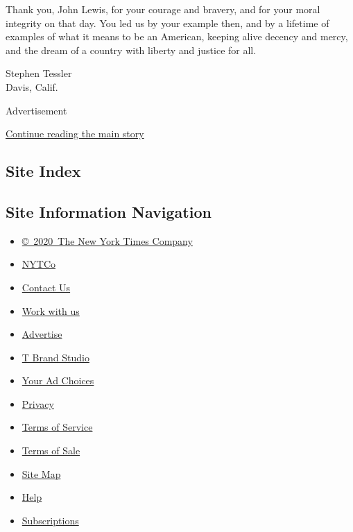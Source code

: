 Thank you, John Lewis, for your courage and bravery, and for your moral
integrity on that day. You led us by your example then, and by a
lifetime of examples of what it means to be an American, keeping alive
decency and mercy, and the dream of a country with liberty and justice
for all.

Stephen Tessler\\
Davis, Calif.

Advertisement

\protect\hyperlink{after-bottom}{Continue reading the main story}

\hypertarget{site-index}{%
\subsection{Site Index}\label{site-index}}

\hypertarget{site-information-navigation}{%
\subsection{Site Information
Navigation}\label{site-information-navigation}}

\begin{itemize}
\tightlist
\item
  \href{https://help.nytimes3xbfgragh.onion/hc/en-us/articles/115014792127-Copyright-notice}{©~2020~The
  New York Times Company}
\end{itemize}

\begin{itemize}
\tightlist
\item
  \href{https://www.nytco.com/}{NYTCo}
\item
  \href{https://help.nytimes3xbfgragh.onion/hc/en-us/articles/115015385887-Contact-Us}{Contact
  Us}
\item
  \href{https://www.nytco.com/careers/}{Work with us}
\item
  \href{https://nytmediakit.com/}{Advertise}
\item
  \href{http://www.tbrandstudio.com/}{T Brand Studio}
\item
  \href{https://www.nytimes3xbfgragh.onion/privacy/cookie-policy\#how-do-i-manage-trackers}{Your
  Ad Choices}
\item
  \href{https://www.nytimes3xbfgragh.onion/privacy}{Privacy}
\item
  \href{https://help.nytimes3xbfgragh.onion/hc/en-us/articles/115014893428-Terms-of-service}{Terms
  of Service}
\item
  \href{https://help.nytimes3xbfgragh.onion/hc/en-us/articles/115014893968-Terms-of-sale}{Terms
  of Sale}
\item
  \href{https://spiderbites.nytimes3xbfgragh.onion}{Site Map}
\item
  \href{https://help.nytimes3xbfgragh.onion/hc/en-us}{Help}
\item
  \href{https://www.nytimes3xbfgragh.onion/subscription?campaignId=37WXW}{Subscriptions}
\end{itemize}
